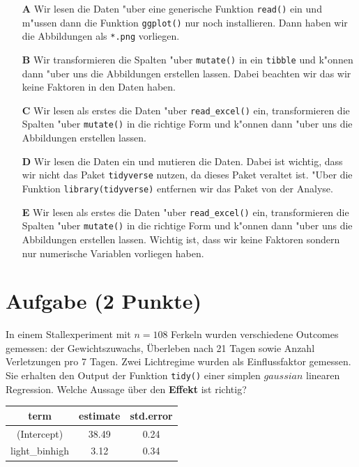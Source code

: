 \documentclass[a4paper, 10pt]{scrartcl}\usepackage[]{graphicx}\usepackage[]{xcolor}
\begin{document}
\begin{enumerate}
\item [\textbf{A} \msquare] Wir lesen die Daten {"u}ber eine generische Funktion \texttt{read()} ein und m{"u}ssen dann die Funktion \texttt{ggplot()} nur noch installieren. Dann haben wir die Abbildungen als \texttt{*.png} vorliegen.
\item [\textbf{B} \msquare] Wir transformieren die Spalten {"u}ber \texttt{mutate()} in ein \texttt{tibble} und k{"o}nnen dann {"u}ber  uns die Abbildungen erstellen lassen. Dabei beachten wir das wir keine Faktoren in den Daten haben.
\item [\textbf{C} \msquare] Wir lesen als erstes die Daten {"u}ber \texttt{read\_excel()} ein, transformieren die Spalten {"u}ber \texttt{mutate()} in die richtige Form und k{"o}nnen dann {"u}ber  uns die Abbildungen erstellen lassen.
\item [\textbf{D} \msquare] Wir lesen die Daten ein und mutieren die Daten. Dabei ist wichtig, dass wir nicht das Paket \texttt{tidyverse} nutzen, da dieses Paket veraltet ist. {"U}ber die Funktion \texttt{library(tidyverse)} entfernen wir das Paket von der Analyse.
\item [\textbf{E} \msquare] Wir lesen als erstes die Daten {"u}ber \texttt{read\_excel()} ein, transformieren die Spalten {"u}ber \texttt{mutate()} in die richtige Form und k{"o}nnen dann  {"u}ber  uns die Abbildungen erstellen lassen. Wichtig ist, dass wir keine Faktoren sondern nur numerische Variablen vorliegen haben.
\end{enumerate}

\section{Aufgabe \hfill (2 Punkte)}



In einem Stallexperiment mit $n = 108$ Ferkeln wurden verschiedene
Outcomes gemessen: der Gewichtszuwachs, {\"U}berleben nach 21 Tagen sowie
Anzahl Verletzungen pro 7 Tagen. Zwei Lichtregime wurden als
Einflussfaktor gemessen. Sie erhalten den \Rlogo Output der Funktion
\texttt{tidy()} einer simplen $gaussian$ linearen
Regression. Welche Aussage {\"u}ber den \textbf{Effekt} ist richtig?

\begin{table}[!h]
\centering
\begin{tabular}{ccc}
\toprule
term & estimate & std.error\\
\midrule
(Intercept) & 38.49 & 0.24\\
light\_binhigh & 3.12 & 0.34\\
\bottomrule
\end{tabular}
\end{table}
\end{document}
